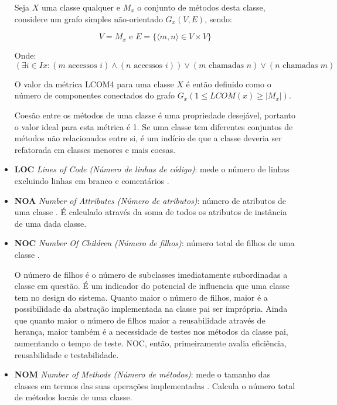 \begin{itemize}
Seja $ X $ uma classe qualquer e $ M_x $ o conjunto de métodos desta classe,
considere um grafo simples não-orientado $ G_x(V, E) $, sendo:

\begin{equation}
V = M_x
\text{ e }
E = \{ \langle m, n \rangle \in V \times V \}
\end{equation}

Onde:
\begin{equation}
(\exists i \in Ix : (m \text{ accessos } i) \land (n \text{ accessos } i)) \lor (m \text{ chamadas } n) \lor (n \text{ chamadas } m)
\end{equation}

O valor da métrica LCOM4 para uma classe $ X $ é então definido como o número
de componentes conectados do grafo $ G_x (1 \leq LCOM(x) \geq | M_x |)$.

Coesão entre os métodos de uma classe é uma propriedade desejável, portanto o
valor ideal para esta métrica é 1. Se uma classe tem diferentes conjuntos de
métodos não relacionados entre si, é um indício de que a classe deveria ser
refatorada em classes menores e mais coesas.

  \item {\bf LOC} {\it Lines of Code (Número de linhas de código)}: mede o
    número de linhas excluindo linhas em branco e comentários
    \cite{Lorenz1994}.

  \item {\bf NOA} {\it Number of Attributes (Número de atributos)}: número de
    atributos de uma classe \cite{Kolewe1993}. É calculado através da soma de
    todos os atributos de instância de uma dada classe.

  \item {\bf NOC} {\it Number Of Children (Número de filhos)}: número total de
    filhos de uma classe \cite{Rosenberg1997}.

O número de filhos é o número de subclasses imediatamente subordinadas a classe
em questão. É um indicador do potencial de influencia que uma classe tem no
design do sistema. Quanto maior o número de filhos, maior é a possibilidade da
abstração implementada na classe pai ser imprópria. Ainda que quanto maior o
número de filhos maior a reusabilidade através de herança, maior também é a
necessidade de testes nos métodos da classe pai, aumentando o tempo de teste.
NOC, então, primeiramente avalia eficiência, reusabilidade e testabilidade.

  \item {\bf NOM} {\it Number of Methods (Número de métodos)}: mede o tamanho
    das classes em termos das suas operações implementadas \cite{Li1993}.
    Calcula o número total de métodos locais de uma classe.


\end{itemize}

